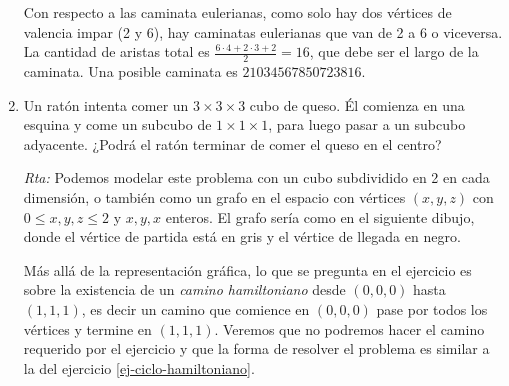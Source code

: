 \documentclass[a4paper,12pt,twoside,spanish,reqno]{amsbook}
\numberwithin{equation}{section}
\newcommand{\rta}{\noindent\textit{Rta: }}
\begin{document}
\begin{enumerate}
    Con respecto a las caminata eulerianas, como solo hay dos vértices de valencia impar (2 y 6),  hay caminatas eulerianas que van de 2 a 6 o viceversa. La cantidad de aristas total es $\frac{6\cdot 4 + 2 \cdot 3 + 2}{2} = 16$,  que debe ser el largo de la caminata. Una posible caminata es $21034567850723816$.  


    \item Un ratón intenta comer un $3\times 3\times 3$ cubo de queso. Él comienza en una esquina y come un subcubo de $1\times 1\times 1$, para luego pasar a un subcubo adyacente. ¿Podrá el ratón terminar de comer el queso en el centro?

    \rta Podemos modelar este problema con un cubo subdividido en 2 en cada dimensión, o también como un grafo en el espacio con vértices $(x,y,z)$ con $0 \le x,y,z \le 2$ y $x,y,x$ enteros. El grafo sería como en el siguiente dibujo, donde el vértice de partida está en gris y el vértice de llegada en negro. 
    \begin{center}
    \end{center}
    Más allá de la representación gráfica, lo que se pregunta en el ejercicio es sobre la existencia de un \textit{camino hamiltoniano} desde $(0,0,0)$ hasta $(1,1,1)$, es decir un camino  que comience en $(0,0,0)$ pase por todos los vértices y  termine en $(1,1,1)$. Veremos que no podremos hacer el camino requerido por el ejercicio y que la forma de resolver el problema es similar a la del ejercicio \ref{ej-ciclo-hamiltoniano}.    
    

\end{enumerate}
\end{document}
